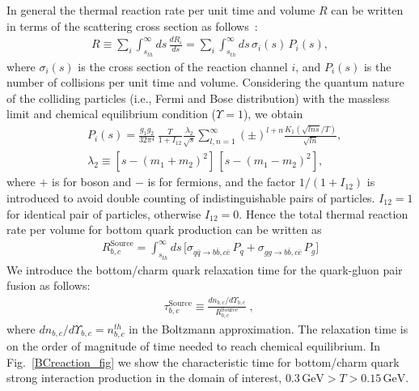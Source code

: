 In general the thermal reaction rate per unit time and volume $R$ can be written in terms of the scattering cross section as follows~\cite{Letessier:2002ony}:
\begin{align}
R\equiv\sum_i\int_{s_{th}}^\infty\!ds\,\frac{dR_i}{ds}=\sum_i\int_{s_{th}}^\infty\!ds\,\sigma_i(s)\,P_i(s),
\end{align}
where $\sigma_i(s)$ is the cross section of the reaction channel $i$, and $P_i(s)$ is the number of collisions per unit time and volume. Considering the quantum nature of the colliding particles (i.e., Fermi and Bose distribution) with the massless limit and chemical equilibrium condition ($\Upsilon=1$), we obtain~\cite{Letessier:2002ony}
\begin{align}
&P_i(s)=\frac{g_1g_2}{32\pi^4}\,\frac{T}{1+I_{12}}\frac{\lambda_2}{\sqrt{s}}\!\sum_{l,n=1}^{\infty}\!(\pm)^{l+n}\frac{K_1(\sqrt{lns}/T)}{\sqrt{ln}},\\
&\lambda_2\equiv\left[s-\left(m_1+m_2\right)^2\right]\,\left[s-\left(m_1-m_2\right)^2\right],
\end{align}
where $+$ is for boson and $-$ is for fermions, and the factor $1/(1+I_{12})$ is introduced to avoid double counting of indistinguishable pairs of particles. $I_{12}=1$ for identical pair of particles, otherwise $I_{12}=0$. Hence the total thermal reaction rate per volume for bottom quark production can be written as
\begin{align}
\label{Bquark_Source}
R^{\mathrm{Source}}_{b,c}=\int^\infty_{s_{th}}ds\,\bigg[\sigma_{q\bar{q}\rightarrow b\bar{b},c\bar{c}}\,P_q+\sigma_{gg\rightarrow b\bar{b},c\bar{c}}\,P_g\bigg]%
\end{align}
We introduce the bottom/charm quark relaxation time for the quark-gluon pair fusion as follows:
\begin{align}
\label{relaxation_time}
&{\tau_{b,c}^{\mathrm{Source}}}\equiv\frac{dn_{b,c}/d\Upsilon_{b,c}}{R^{\mathrm{Source}}_{b,c}}\;,\quad
\end{align}
where $dn_{b,c}/d\Upsilon_{b,c}=n^{th}_{b,c}$ in the Boltzmann approximation. The relaxation time is on the order of magnitude of time needed to reach chemical equilibrium. In Fig.~\ref{BCreaction_fig} we show the characteristic time for bottom/charm  quark strong interaction production in the domain of interest, $ 0.3\,\mathrm{GeV}>T> 0.15\,\mathrm{GeV}$. 

